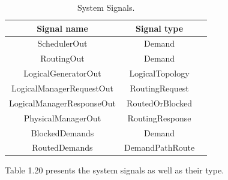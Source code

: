 \begin{table}[H]
	\centering
	\begin{tabular}{| c | c | c |}
		\hline
		 \textbf{Signal name} &  \textbf{Signal type} \\ %
		\hline
		SchedulerOut &  Demand\\ \hline
		RoutingOut & Demand\\ \hline
		LogicalGeneratorOut &  LogicalTopology\\ \hline
		LogicalManagerRequestOut & RoutingRequest\\ \hline
		LogicalManagerResponseOut &  RoutedOrBlocked\\ \hline
		PhysicalManagerOut &   RoutingResponse\\ \hline
		BlockedDemands &   Demand\\ \hline
		RoutedDemands & DemandPathRoute\\ \hline
	\end{tabular}
	\caption{System Signals.}
	\label{system_signals}
\end{table}
	Table 1.20 presents the system signals as well as their type.\\ \\

